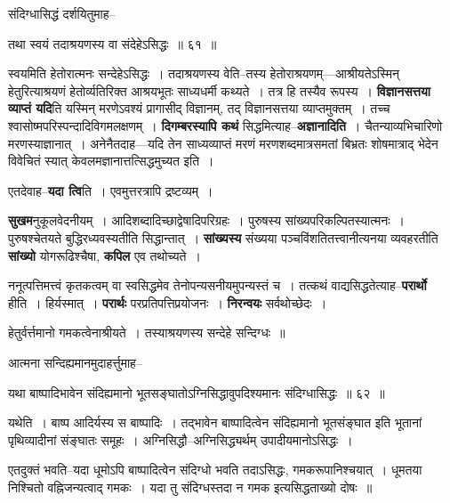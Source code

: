 \documentclass[article,12pt,a4paper]{memoir}
\begin{document}
	संदिग्धासिद्धं दर्शयितुमाह--  
	  
	तथा स्वयं तदाश्रयणस्य वा संदेहेऽसिद्धः ॥ ६१ ॥ 
	  
	स्वयमिति हेतोरात्मनः सन्देहेऽसिद्धः । तदाश्रयणस्य वेति--तस्य हेतोराश्रयणम्—आश्रीयतेऽस्मिन् हेतुरित्याश्रयणं हेतोर्व्यतिरिक्त आश्रयभूतः साध्यधर्मी कथ्यते । तत्र हि तस्यैव रूपस्य । \textbf{विज्ञानसत्तया व्याप्तं यदि}ति यस्मिन् मरणेऽवश्यं प्रागासीद् विज्ञानम्, तद् विज्ञानसत्तया व्याप्तमुक्तम् । तच्च श्वासोष्मपरिस्पन्दादिविगमलक्षणम् । \textbf{दिगम्बरस्यापि कथं} सिद्धमित्याह--\textbf{अज्ञानादिति} । चैतन्याव्यभिचारिणो मरणस्याज्ञानात् । अनेनैतदाह—यदि तेन साध्यव्याप्तं मरणं मरणशब्दमात्रसमतां बिभ्रतः शोषमात्राद् भेदेन विवेचितं स्यात् केवलमज्ञानात्तत्सिद्धमुच्यत इति ।
	\pend
      

	  \pstart एतदेवाह--\textbf{यदा त्वि}ति । एवमुत्तरत्रापि द्रष्टव्यम् ।
	\pend
      

	  \pstart \textbf{सुखम}नुकूलवेदनीयम् । आदिशब्दादिच्छाद्वेषादिपरिग्रहः । पुरुषस्य सांख्यपरिकल्पितस्यात्मनः । पुरुषश्चेतयते बुद्धिरध्यवस्यतीति सिद्धान्तात् । \textbf{सांख्यस्य} संख्यया पञ्चविंशतितत्त्वानीत्यनया व्यवहरतीति \textbf{सांख्यो} योगरूढिश्चैषा, \textbf{कपिल} एव तथोच्यते ।
	\pend
      

	  \pstart ननूत्पत्तिमत्त्वं कृतकत्वम् वा स्वसिद्धमेव तेनोपन्यसनीयमुपन्यस्तं च । तत्कथं वाद्यसिद्धतेत्याह--\textbf{परार्थो} हीति । हिर्यस्मात् । \textbf{परार्थः} परप्रतिपत्तिप्रयोजनः । \textbf{निरन्वयः} सर्वथोच्छेदः ।  \leavevmode{} 
	  
	हेतुर्वर्त्तमानो गमकत्वेनाश्रीयते । तस्याश्रयणस्य सन्देहे सन्दिग्धः ॥  
	  
	आत्मना सन्दिह्यमानमुदाहर्त्तुमाह--  
	  
	यथा बाष्पादिभावेन संदिह्यमानो भूतसङ्घातोऽग्निसिद्धावुपदिश्यमानः संदिग्धासिद्धः ॥ ६२ ॥ 
	  
	यथेति । बाष्प आदिर्यस्य स बाष्पादिः । तद्भावेन बाष्पादित्वेन संदिह्यमानो भूतसंङ्घात इति भूतानां पृथिव्यादीनां संङ्घातः समूहः । अग्निसिद्धौ--अग्निसिद्ध्यर्थम् उपादीयमानोऽसिद्धः ।  
	  
	एतदुक्तं भवति--यदा धूमोऽपि बाष्पादित्वेन संदिग्धो भवति तदाऽसिद्धः, गमकरूपानिश्चयात् । धूमतया निश्चितो वह्निजन्यत्वाद् गमकः । यदा तु संदिग्धस्तदा न गमक इत्यसिद्धताख्यो दोषः ॥  
	  
\end{document}
